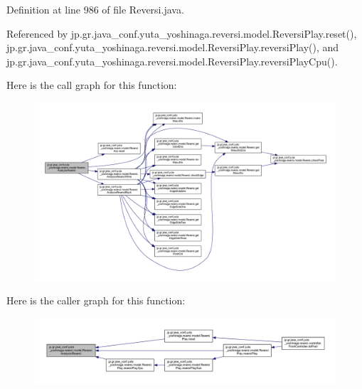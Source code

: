 Definition at line 986 of file Reversi.\+java.



Referenced by jp.\+gr.\+java\+\_\+conf.\+yuta\+\_\+yoshinaga.\+reversi.\+model.\+Reversi\+Play.\+reset(), jp.\+gr.\+java\+\_\+conf.\+yuta\+\_\+yoshinaga.\+reversi.\+model.\+Reversi\+Play.\+reversi\+Play(), and jp.\+gr.\+java\+\_\+conf.\+yuta\+\_\+yoshinaga.\+reversi.\+model.\+Reversi\+Play.\+reversi\+Play\+Cpu().

Here is the call graph for this function\+:\nopagebreak
\begin{figure}[H]
\begin{center}
\leavevmode
\includegraphics[width=350pt]{classjp_1_1gr_1_1java__conf_1_1yuta__yoshinaga_1_1reversi_1_1model_1_1_reversi_a43098c043d0424bb5e5e60db358a324d_cgraph}
\end{center}
\end{figure}
Here is the caller graph for this function\+:\nopagebreak
\begin{figure}[H]
\begin{center}
\leavevmode
\includegraphics[width=350pt]{classjp_1_1gr_1_1java__conf_1_1yuta__yoshinaga_1_1reversi_1_1model_1_1_reversi_a43098c043d0424bb5e5e60db358a324d_icgraph}
\end{center}
\end{figure}
\mbox{\label{classjp_1_1gr_1_1java__conf_1_1yuta__yoshinaga_1_1reversi_1_1model_1_1_reversi_adb74246f49150e02201766a1fa6cf732}} 
